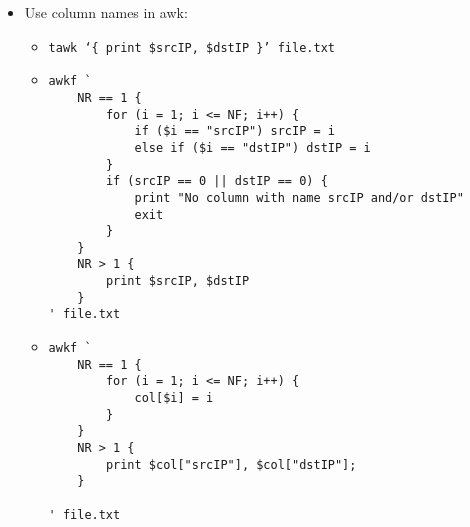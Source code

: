 \documentclass[documentation]{subfiles}
\begin{document}
\begin{itemize}
    \item Use column names in awk:
        \begin{itemize}
            \item {\tt tawk `\{ print \$srcIP, \$dstIP \}' file.txt}
            \item \begin{verbatim}
awkf `
    NR == 1 {
        for (i = 1; i <= NF; i++) {
            if ($i == "srcIP") srcIP = i
            else if ($i == "dstIP") dstIP = i
        }
        if (srcIP == 0 || dstIP == 0) {
            print "No column with name srcIP and/or dstIP"
            exit
        }
    }
    NR > 1 {
        print $srcIP, $dstIP
    }
' file.txt
\end{verbatim}
            \item \begin{verbatim}
awkf `
    NR == 1 {
        for (i = 1; i <= NF; i++) {
            col[$i] = i
        }
    }
    NR > 1 {
        print $col["srcIP"], $col["dstIP"];
    }

' file.txt
\end{verbatim}
        \end{itemize}
\end{itemize}
\end{document}
